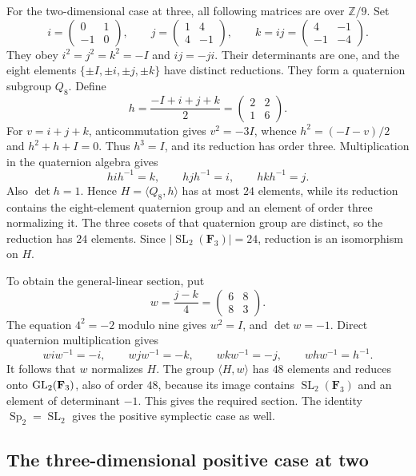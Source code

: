 \documentclass[11pt]{article}
\DeclareMathOperator{\SL}{SL}\DeclareMathOperator{\Sp}{Sp}
\theoremstyle{definition}\newtheorem{definition}[theorem]{Definition}
\theoremstyle{remark}\newtheorem{remark}[theorem]{Remark}
\begin{document}
For the two-dimensional case at three, all following matrices are over
$\mathbb Z/9$. Set
\[
 i=\begin{pmatrix}0&1\\-1&0\end{pmatrix},\qquad
 j=\begin{pmatrix}1&4\\4&-1\end{pmatrix},\qquad
 k=ij=\begin{pmatrix}4&-1\\-1&-4\end{pmatrix}.
\]
They obey $i^2=j^2=k^2=-I$ and $ij=-ji$. Their determinants are one,
and the eight elements $\{\pm I,\pm i,\pm j,\pm k\}$ have distinct
reductions. They form a quaternion subgroup $Q_8$.
Define
\[
 h=\frac{-I+i+j+k}{2}=\begin{pmatrix}2&2\\1&6\end{pmatrix}.
\]
For $v=i+j+k$, anticommutation gives $v^2=-3I$, whence
$h^2=(-I-v)/2$ and $h^2+h+I=0$. Thus $h^3=I$, and its reduction has
order three. Multiplication in the quaternion algebra gives
\[
 hih^{-1}=k,\qquad hjh^{-1}=i,\qquad hkh^{-1}=j.
\]
Also $\det h=1$. Hence $H=\langle Q_8,h\rangle$ has at most $24$
elements, while its reduction contains the eight-element quaternion group
and an element of order three normalizing it. The three cosets of that
quaternion group are distinct, so the reduction has $24$ elements. Since
$|\SL_2(\mathbf F_3)|=24$, reduction is an isomorphism on $H$.

To obtain the general-linear section, put
\[
 w=\frac{j-k}{4}=\begin{pmatrix}6&8\\8&3\end{pmatrix}.
\]
The equation $4^2=-2$ modulo nine gives $w^2=I$, and $\det w=-1$.
Direct quaternion multiplication gives
\[
 wiw^{-1}=-i,\qquad wjw^{-1}=-k,\qquad
 wkw^{-1}=-j,\qquad whw^{-1}=h^{-1}.
\]
It follows that $w$ normalizes $H$. The group $\langle H,w\rangle$ has
$48$ elements and reduces onto $\operatorname{GL}_2(\mathbf F_3)$, also of order
$48$, because its image contains $\SL_2(\mathbf F_3)$ and an element
of determinant $-1$. This gives the required section. The identity
$\Sp_2=\SL_2$ gives the positive symplectic case as well.

\subsection{The three-dimensional positive case at two}
\end{document}
